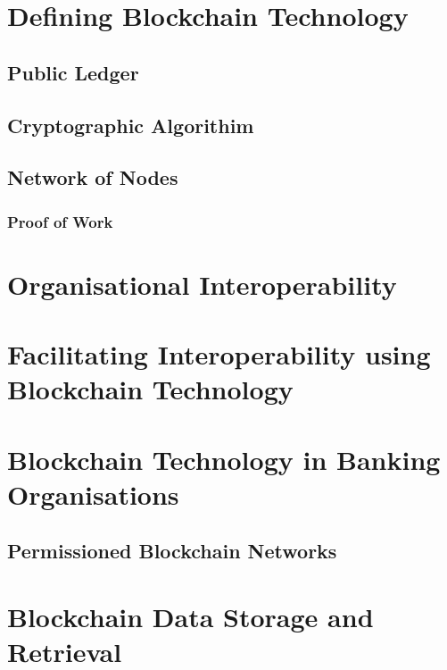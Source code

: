 \section{Defining Blockchain Technology}

\subsection{Public Ledger}

\subsection{Cryptographic Algorithim}

\subsection{Network of Nodes}

\subsubsection{Proof of Work}

\section{Organisational Interoperability}

\section{Facilitating Interoperability using Blockchain Technology}

\section{Blockchain Technology in Banking Organisations}

\subsection{Permissioned Blockchain Networks}

\section{Blockchain Data Storage and Retrieval}